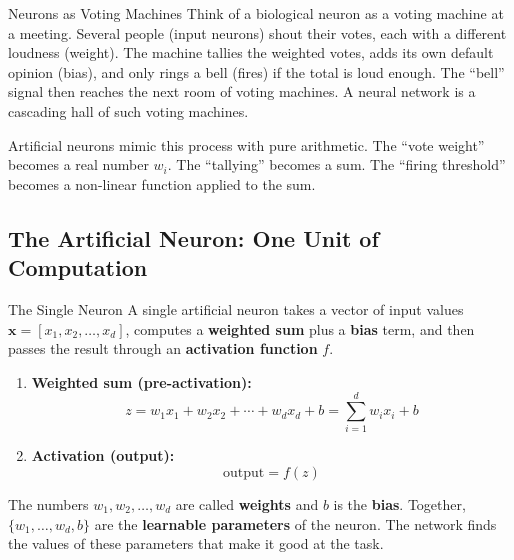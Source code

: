 \begin{analogybox}{Neurons as Voting Machines}
Think of a biological neuron as a voting machine at a meeting. Several people (input neurons) shout their votes, each with a different loudness (weight). The machine tallies the weighted votes, adds its own default opinion (bias), and only rings a bell (fires) if the total is loud enough. The ``bell'' signal then reaches the next room of voting machines. A neural network is a cascading hall of such voting machines.
\end{analogybox}

Artificial neurons mimic this process with pure arithmetic. The ``vote weight'' becomes a real number $w_i$. The ``tallying'' becomes a sum. The ``firing threshold'' becomes a non-linear function applied to the sum.

\subsection{The Artificial Neuron: One Unit of Computation}

\begin{conceptbox}{The Single Neuron}
A single artificial neuron takes a vector of input values $\mathbf{x} = [x_1, x_2, \ldots, x_d]$, computes a \textbf{weighted sum} plus a \textbf{bias} term, and then passes the result through an \textbf{activation function} $f$.

\begin{enumerate}
    \item \textbf{Weighted sum (pre-activation):}
    \begin{equation}
        z = w_1 x_1 + w_2 x_2 + \cdots + w_d x_d + b = \sum_{i=1}^{d} w_i x_i + b
    \end{equation}

    \item \textbf{Activation (output):}
    \begin{equation}
        \text{output} = f(z)
    \end{equation}
\end{enumerate}

The numbers $w_1, w_2, \ldots, w_d$ are called \textbf{weights} and $b$ is the \textbf{bias}. Together, $\{w_1, \ldots, w_d, b\}$ are the \textbf{learnable parameters} of the neuron. The network finds the values of these parameters that make it good at the task.
\end{conceptbox}

